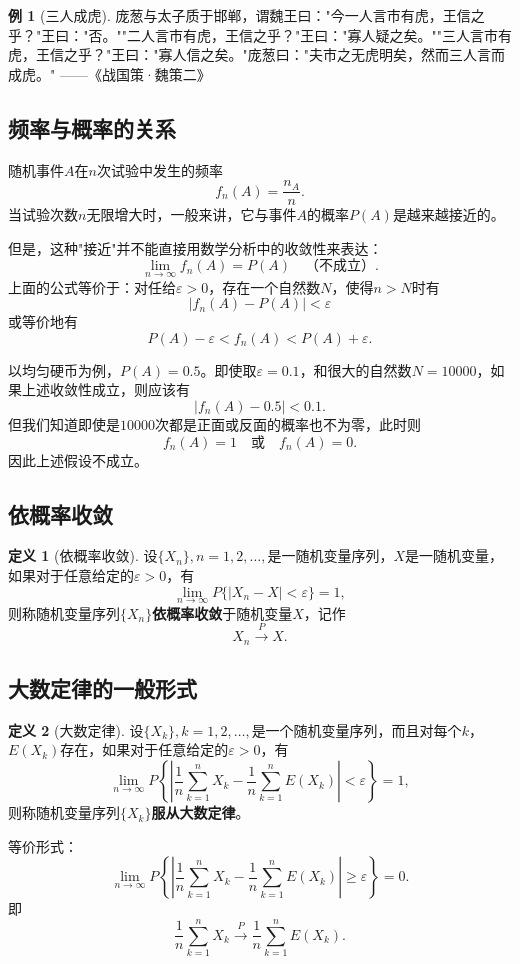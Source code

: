 \documentclass[11pt,a4paper]{report}
\theoremstyle{definition}
\newtheorem{definition}{定义}[chapter]
\newtheorem{example}{例}[chapter]
\begin{document}
\begin{example}[三人成虎]
庞葱与太子质于邯郸，谓魏王曰："今一人言市有虎，王信之乎？"王曰："否。""二人言市有虎，王信之乎？"王曰："寡人疑之矣。""三人言市有虎，王信之乎？"王曰："寡人信之矣。"庞葱曰："夫市之无虎明矣，然而三人言而成虎。"
——《战国策·魏策二》
\end{example}

\subsection{频率与概率的关系}

随机事件$A$在$n$次试验中发生的频率
\[
f_{n}(A)=\frac{n_{A}}{n}.
\]
当试验次数$n$无限增大时，一般来讲，它与事件$A$的概率$P(A)$是越来越接近的。

但是，这种"接近"并不能直接用数学分析中的收敛性来表达：
\[
\lim_{n\to\infty}f_{n}(A)=P(A) \quad \text{（不成立）}.
\]
上面的公式等价于：对任给$\varepsilon>0$，存在一个自然数$N$，使得$n>N$时有
\[
|f_{n}(A)-P(A)|<\varepsilon
\]
或等价地有
\[
P(A)-\varepsilon<f_{n}(A)<P(A)+\varepsilon.
\]

以均匀硬币为例，$P(A)=0.5$。即使取$\varepsilon=0.1$，和很大的自然数$N=10000$，如果上述收敛性成立，则应该有
\[
|f_{n}(A)-0.5|<0.1.
\]
但我们知道即使是$10000$次都是正面或反面的概率也不为零，此时则
\[
f_{n}(A)=1 \quad\text{或}\quad f_{n}(A)=0.
\]
因此上述假设不成立。

\subsection{依概率收敛}

\begin{definition}[依概率收敛]
设$\{X_{n}\},n=1,2,\ldots,$是一随机变量序列，$X$是一随机变量，如果对于任意给定的$\varepsilon>0$，有
\[
\lim_{n\to\infty}P\{|X_{n}-X|<\varepsilon\}=1,
\]
则称随机变量序列$\{X_{n}\}$\textbf{依概率收敛}于随机变量$X$，记作
\[
X_{n}\stackrel{P}{\rightarrow}X.
\]
\end{definition}

\subsection{大数定律的一般形式}

\begin{definition}[大数定律]
设$\{X_{k}\},k=1,2,\ldots,$是一个随机变量序列，而且对每个$k$，$E(X_{k})$存在，如果对于任意给定的$\varepsilon>0$，有
\[
\lim_{n\to\infty}P\left\{\left|\frac{1}{n}\sum_{k=1}^{n}X_{k}-\frac{1}{n}\sum_{k=1}^{n}E(X_{k})\right|<\varepsilon\right\}=1,
\]
则称随机变量序列$\{X_{k}\}$\textbf{服从大数定律}。

等价形式：
\[
\lim_{n\to\infty}P\left\{\left|\frac{1}{n}\sum_{k=1}^{n}X_{k}-\frac{1}{n}\sum_{k=1}^{n}E(X_{k})\right|\geq\varepsilon\right\}=0.
\]
即
\[
\frac{1}{n}\sum_{k=1}^{n}X_{k}\stackrel{P}{\rightarrow}\frac{1}{n}\sum_{k=1}^{n}E(X_{k}).
\]
\end{definition}
\end{document}
